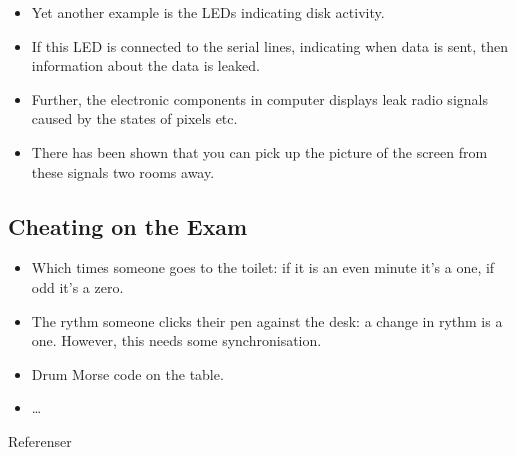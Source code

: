 \documentclass{beamer}
\begin{document}
\begin{frame}{\insertsubsectionhead}
  \begin{itemize}
    \item Yet another example is the LEDs indicating disk activity.

    \item If this LED is connected to the serial lines, indicating when data is 
      sent, then information about the data is leaked.

    \item Further, the electronic components in computer displays leak radio 
      signals caused by the states of pixels etc.

    \item There has been shown that you can pick up the picture of the screen 
      from these signals two rooms away.

  \end{itemize}
\end{frame}

\subsection{Cheating on the Exam}

\begin{frame}{\insertsubsectionhead}
  \begin{itemize}
    \item Which times someone goes to the toilet: if it is an even minute it's 
      a one, if odd it's a zero.

    \item The rythm someone clicks their pen against the desk: a change in 
      rythm is a one.
      However, this needs some synchronisation.

    \item Drum Morse code on the table.

    \item \dots

  \end{itemize}
\end{frame}



\begin{frame}{Referenser}
  \small
  \printbibliography{}
\end{frame}
\end{document}
